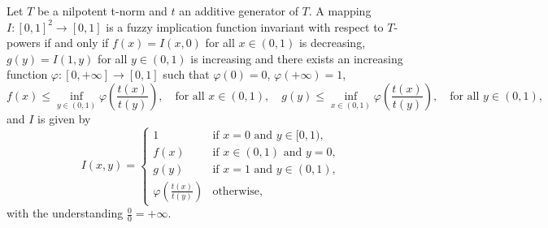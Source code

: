 \begin{proposition}\label{prop:nilpot:TPowerInv}
	Let $T$ be a nilpotent t-norm and $t$ an additive generator of $T$. A mapping $I:[0,1]^2 \to [0,1]$ is a fuzzy implication function invariant with respect to $T$-powers if and only if $f(x)=I(x,0)$ for all $x \in (0,1)$ is decreasing, $g(y)=I(1,y)$ for all $y \in (0,1)$ is increasing and there exists an increasing function $\varphi:[0,+\infty] \to [0,1]$ such that $\varphi(0)=0$, $\varphi(+\infty)=1$, 
	\begin{equation}\label{eq:prop:nilpot:TPowerInv:MonotonicityCond}
		f(x) \leq \inf_{y \in (0,1)} \varphi \left(\frac{t(x)}{t(y)}\right), \quad \text{for all } x \in (0,1), \quad
		g(y) \leq \inf_{x \in (0,1)} \varphi \left(\frac{t(x)}{t(y)}\right), \quad \text{for all } y \in (0,1),
	\end{equation}
	and $I$ is given by
	\begin{equation}\label{eq:prop:nilpot:TPowerInv:Expression}
		I(x,y) =\left\{ \begin{array}{ll}
			1 & \text{if } x=0 \text{ and } y \in [0,1),\\
			f(x) &   \text{if }   x \in (0,1) \text{ and } y=0, \\
			g(y) &  \text{if }  x = 1 \text{ and } y\in (0,1), \\
			\varphi \left(\frac{t(x)}{t(y)}\right) &  \text{otherwise},
		\end{array}
		\right.
	\end{equation}
	with the understanding $\frac{0}{0} = +\infty$.
\end{proposition}
